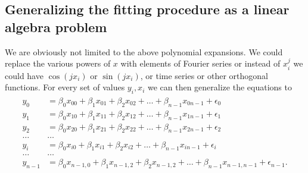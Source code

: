 \documentclass[letterpaper,10pt,english]{sphinxmanual}
\begin{document}
\subsection{Generalizing the fitting procedure as a linear algebra problem}
\label{\detokenize{chapter4:generalizing-the-fitting-procedure-as-a-linear-algebra-problem}}
We are obviously not limited to the above polynomial expansions.  We
could replace the various powers of \(x\) with elements of Fourier
series or instead of \(x_i^j\) we could have \(\cos{(j x_i)}\) or \(\sin{(j
x_i)}\), or time series or other orthogonal functions.  For every set
of values \(y_i,x_i\) we can then generalize the equations to
\begin{equation*}
\begin{split}
\begin{align*}
y_0&=\beta_0x_{00}+\beta_1x_{01}+\beta_2x_{02}+\dots+\beta_{n-1}x_{0n-1}+\epsilon_0\\
y_1&=\beta_0x_{10}+\beta_1x_{11}+\beta_2x_{12}+\dots+\beta_{n-1}x_{1n-1}+\epsilon_1\\
y_2&=\beta_0x_{20}+\beta_1x_{21}+\beta_2x_{22}+\dots+\beta_{n-1}x_{2n-1}+\epsilon_2\\
\dots & \dots \\
y_{i}&=\beta_0x_{i0}+\beta_1x_{i1}+\beta_2x_{i2}+\dots+\beta_{n-1}x_{in-1}+\epsilon_i\\
\dots & \dots \\
y_{n-1}&=\beta_0x_{n-1,0}+\beta_1x_{n-1,2}+\beta_2x_{n-1,2}+\dots+\beta_{n-1}x_{n-1,n-1}+\epsilon_{n-1}.\\
\end{align*}
\end{split}
\end{equation*}
\end{document}
